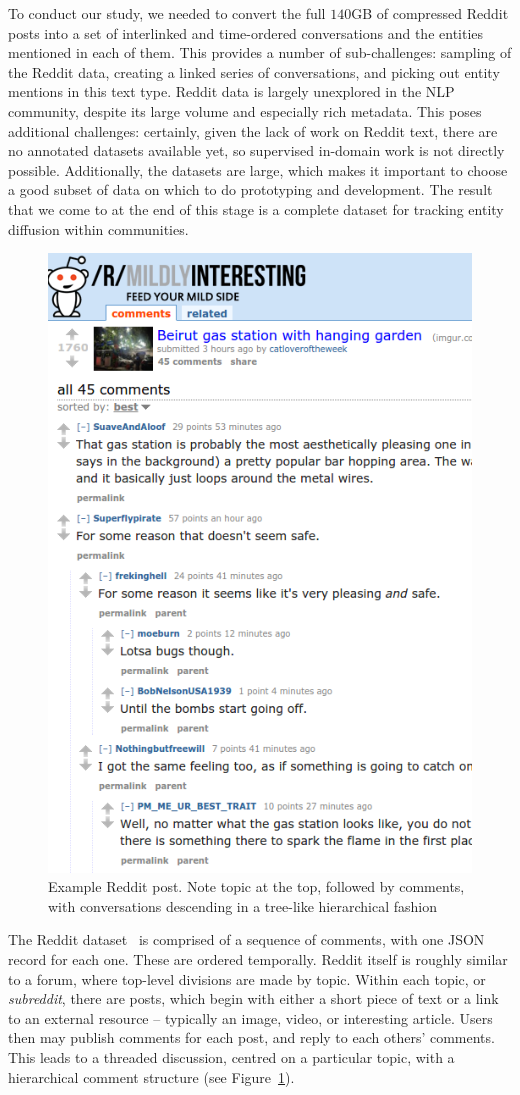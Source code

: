 \documentclass[review]{elsarticle}
\begin{document}
To conduct our study, we needed to convert the full $140$GB of compressed Reddit posts into a set of interlinked and time-ordered conversations and the entities mentioned in each of them.
This provides a number of sub-challenges: sampling of the Reddit data, creating a linked series of conversations, and picking out entity mentions in this text type.
Reddit data is largely unexplored in the NLP community, despite its large volume and especially rich metadata.
This poses additional challenges: certainly, given the lack of work on Reddit text, there are no annotated datasets available yet, so supervised in-domain work is not directly possible.
Additionally, the datasets are large, which makes it important to choose a good subset of data on which to do prototyping and development.
The result that we come to at the end of this stage is a complete dataset for tracking entity diffusion within communities.

\begin{figure}
\centering
\label{fig:reddit-example}
\includegraphics[width=0.4\columnwidth]{reddit-example.png}
\caption{Example Reddit post. Note topic at the top, followed by comments, with conversations descending in a tree-like hierarchical fashion}
\end{figure}

The Reddit dataset~\cite{reddit-data} is comprised of a sequence of comments, with one JSON record for each one.
These are ordered temporally.
Reddit itself is roughly similar to a forum, where top-level divisions are made by topic.
Within each topic, or {\em subreddit}, there are posts, which begin with either a short piece of text or a link to an external resource -- typically an image, video, or interesting article.
Users then may publish comments for each post, and reply to each others' comments.
This leads to a threaded discussion, centred on a particular topic, with a hierarchical comment structure (see Figure~\ref{fig:reddit-example}).
\end{document}
